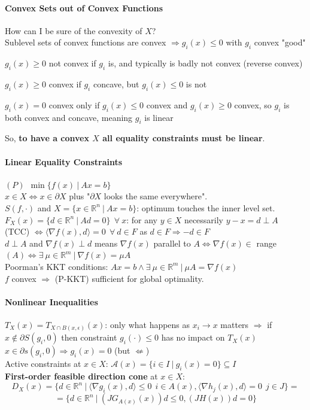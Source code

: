 \documentclass[10pt]{report}
\begin{document}
\paragraph{Convex Sets out of Convex Functions} How can I be sure of the convexity of $X$?\\
Sublevel sets of convex functions are convex $\Rightarrow g_i(x)\leq 0$ with $g_i$ convex "good"\begin{list}{}{}
	\item $g_i(x) \geq 0$ not convex if $g_i$ is, and typically is badly not convex (reverse convex)
	\item $g_i(x) \geq 0$ convex if $g_i$ concave, but $g_i(x) \leq 0$ is not
	\item $g_i(x) = 0$ convex only if $g_i(x)\leq 0$ convex and $g_i(x) \geq 0$ convex, so $g_i$ is both convex and concave, meaning $g_i$ is linear
\end{list}
So, \textbf{to have a convex $X$ all equality constraints must be linear}.
\paragraph{Linear Equality Constraints} $(P)\:\:\min\{f(x)\:|\:Ax=b\}$\\
$x\in X \Leftrightarrow x\in \partial X$ plus "$\partial X$ looks the same everywhere".\\
$S(f,\cdot)$ and $X=\{x\in \mathbb{R}^n\:|\:Ax=b\}$: optimum touches the inner level set.\\
$F_X(x) = \{d\in \mathbb{R}^n\:|\:Ad=0\}\:\:\forall\:x$: for any $y\in X$ necessarily $y-x = d\perp A$\\
(TCC) $\Leftrightarrow \langle\nabla f(x),d\rangle = 0\:\:\forall\:d\in F$ as $d\in F\Rightarrow -d\in F$\\
$d\perp A$ and $\nabla f(x)\perp d$ means $\nabla f(x)$ parallel to $A\Leftrightarrow\nabla f(x)\in $ range$(A)\Leftrightarrow\exists\:\mu\in \mathbb{R}^m\:|\:\nabla f(x) = \mu A$\\
Poorman's KKT conditions: $Ax = b \wedge \exists\:\mu\in \mathbb{R}^m\:|\:\mu A = \nabla f(x)$\\
$f$ convex $\Rightarrow$ (P-KKT) sufficient for global optimality.
\paragraph{Nonlinear Inequalities} $T_X(x) = T_{X\cap B(x,\epsilon)}(x)$: only what happens as $x_i\rightarrow x$ matters $\Rightarrow$ if $x\not\in \partial S(g_i,0)$ then constraint $g_i(\cdot)\leq 0$ has no impact on $T_X(x)$\\
$x\in\partial s(g_i,0)\Rightarrow g_i(x)=0$ (but $\not\Leftarrow$)\\
Active constraints at $x\in X$: $\mathscr{A}(x) = \{i\in I\:|\:g_i(x)=0\}\subseteq I$\\
\textbf{First-order feasible direction cone} at $x\in X$: $$D_X(x) = \{d\in \mathbb{R}^n\:|\:\langle\nabla g_i(x), d\rangle\leq 0\:\:i\in A(x),\langle\nabla h_j(x),d\rangle = 0\:\:j\in J\}=$$ $$=\{d\in \mathbb{R}^n\:|\:(JG_{A(x)}(x))d\leq 0, (JH(x))d=0\}$$
\end{document}
